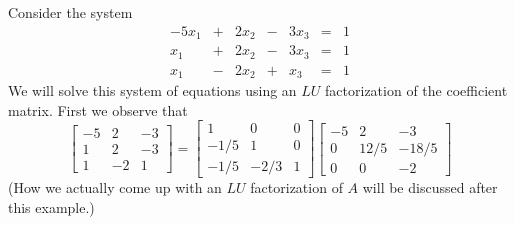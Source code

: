 \documentclass{ximera}
\begin{document}
\begin{example}\label{ex:usingLU}
Consider the system
$$\begin{array}{ccccccccc}
	 -5x_1& +&2x_2&-&3x_3&=&1\\
	   x_1 &+ &2x_2&-&3x_3&= &1 \\
      x_1&- &2x_2&+&x_3&=&1
    \end{array}$$
We will solve this system of equations using an $LU$ factorization of the coefficient matrix.  First we observe that 
\[
\begin{bmatrix}
-5 & 2 & -3 \\
1 & 2 & -3 \\
1 & -2 & 1\end{bmatrix}
=
\begin{bmatrix}
1 & 0 & 0 \\
-1/5 & 1 & 0 \\
-1/5  & -2/3  & 1
\end{bmatrix} 
\begin{bmatrix}
-5 & 2 & -3 \\
0 & 12/5  & -18/5 \\
0 & 0 & -2
\end{bmatrix}
\]
(How we actually come up with an  $LU$ factorization of $A$ will be discussed after this example.)


\end{example}
\end{document}
